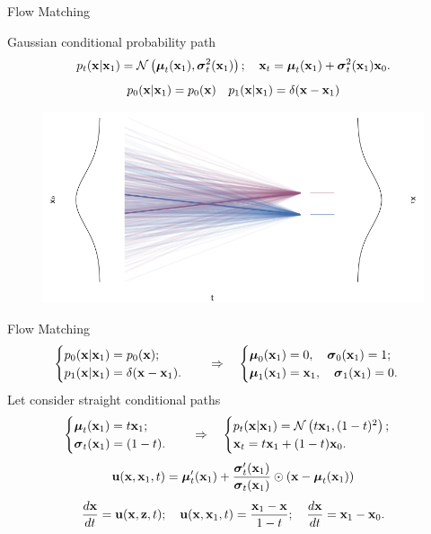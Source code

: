 \begin{frame}{Flow Matching}
	\begin{block}{Gaussian conditional probability path}
		\vspace{-0.4cm}
		\[
			p_t(\mathbf{x} | \mathbf{x}_1) = \mathcal{N}\left(\boldsymbol{\mu}_t(\mathbf{x}_1), \boldsymbol{\sigma}_t^2(\mathbf{x}_1)\right); \quad \mathbf{x}_t = \boldsymbol{\mu}_t(\mathbf{x}_1) +  \boldsymbol{\sigma}_t^2(\mathbf{x}_1) \mathbf{x}_0.
		\]
		\[
			p_0(\mathbf{x} | \mathbf{x}_1) = p_0(\mathbf{x}) \quad p_1(\mathbf{x} | \mathbf{x}_1) = \delta(\mathbf{x} - \mathbf{x}_1)
		\]
		\vspace{-0.6cm}
	\end{block}
	\begin{figure}
		\centering
		\includegraphics[width=0.8\linewidth]{figs/heatmap_with_cond_traj-v3}
	\end{figure}
\end{frame}
\begin{frame}{Flow Matching}
	\[
		\begin{cases}
			p_0(\mathbf{x} | \mathbf{x}_1) = p_0(\mathbf{x}); \\
			p_1(\mathbf{x} | \mathbf{x}_1) = \delta(\mathbf{x} - \mathbf{x}_1).
		\end{cases}
		\quad \Rightarrow \quad 
		\begin{cases}
			\boldsymbol{\mu}_0(\mathbf{x}_1) = 0, \quad \boldsymbol{\sigma}_0(\mathbf{x}_1) = 1; \\
			\boldsymbol{\mu}_1(\mathbf{x}_1) = \mathbf{x}_1, \quad \boldsymbol{\sigma}_1(\mathbf{x}_1) = 0.
		\end{cases}
	\]
	Let consider straight conditional paths	
	\[
		\begin{cases}
			\boldsymbol{\mu}_t(\mathbf{x}_1) = t \mathbf{x}_1; \\
			\boldsymbol{\sigma}_t(\mathbf{x}_1) = (1 - t).
		\end{cases}
		\quad \Rightarrow \quad 
		\begin{cases}
			p_t(\mathbf{x} | \mathbf{x}_1) = \mathcal{N}\left(t \mathbf{x}_1, (1-t)^2\right); \\
		 	\mathbf{x}_t = t \mathbf{x}_1 + (1 - t) \mathbf{x}_0. \\
		 \end{cases}
	\]
	\[
		\mathbf{u}(\mathbf{x}, \mathbf{x}_1, t) =  \boldsymbol{\mu}_t'(\mathbf{x}_1) + \frac{\boldsymbol{\sigma}_t'(\mathbf{x}_1)}{\boldsymbol{\sigma}_t(\mathbf{x}_1)} \odot (\mathbf{x} - \boldsymbol{\mu}_t(\mathbf{x}_1))
	\]
	\[
		 \frac{d\mathbf{x}}{dt} = \mathbf{u}(\mathbf{x}, \mathbf{z}, t); \quad \mathbf{u}(\mathbf{x}, \mathbf{x}_1, t) = \frac{\mathbf{x}_1  - \mathbf{x}}{1-t}; \quad \frac{d\mathbf{x}}{dt} = \mathbf{x}_1 - \mathbf{x}_0.
	\]
\end{frame}
